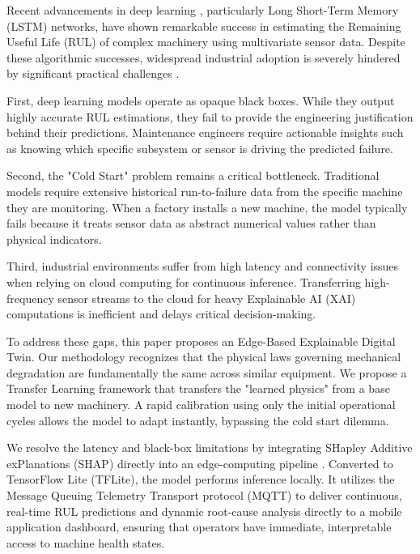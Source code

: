 \documentclass[journal]{IEEEtran}
\begin{document}
Recent advancements in deep learning , particularly Long Short-Term Memory (LSTM) networks, have shown remarkable success in estimating the Remaining Useful Life (RUL) of complex machinery using multivariate sensor data. Despite these algorithmic successes, widespread industrial adoption is severely hindered by significant practical challenges \cite{zheng2017}.

First, deep learning models operate as opaque black boxes. While they output highly accurate RUL estimations, they fail to provide the engineering justification behind their predictions. Maintenance engineers require actionable insights such as knowing which specific subsystem or sensor is driving the predicted failure\cite{lundberg2017}.

Second, the "Cold Start" problem remains a critical bottleneck. Traditional models require extensive historical run-to-failure data from the specific machine they are monitoring. When a factory installs a new machine, the model typically fails because it treats sensor data as abstract numerical values rather than physical indicators\cite{zhao2019}. 

Third, industrial environments suffer from high latency and connectivity issues when relying on cloud computing for continuous inference. Transferring high-frequency sensor streams to the cloud for heavy  Explainable AI (XAI) computations is inefficient and delays critical decision-making\cite{chen2019}.

To address these gaps, this paper proposes an Edge-Based Explainable Digital Twin. Our methodology recognizes that the physical laws governing mechanical degradation are fundamentally the same across similar equipment. We propose a Transfer Learning framework that transfers the "learned physics" from a base model to new machinery. A rapid calibration using only the initial operational cycles allows the model to adapt instantly, bypassing the cold start dilemma.

We resolve the latency and black-box limitations by integrating SHapley Additive exPlanations (SHAP) directly into an edge-computing pipeline \cite{lundberg2017}. Converted to TensorFlow Lite (TFLite), the model performs inference locally. It utilizes the Message Queuing Telemetry Transport protocol (MQTT) to deliver continuous, real-time RUL predictions and dynamic root-cause analysis directly to a mobile application dashboard, ensuring that operators have immediate, interpretable access to machine health states\cite{david2021,alfuqaha2015}.
\end{document}
